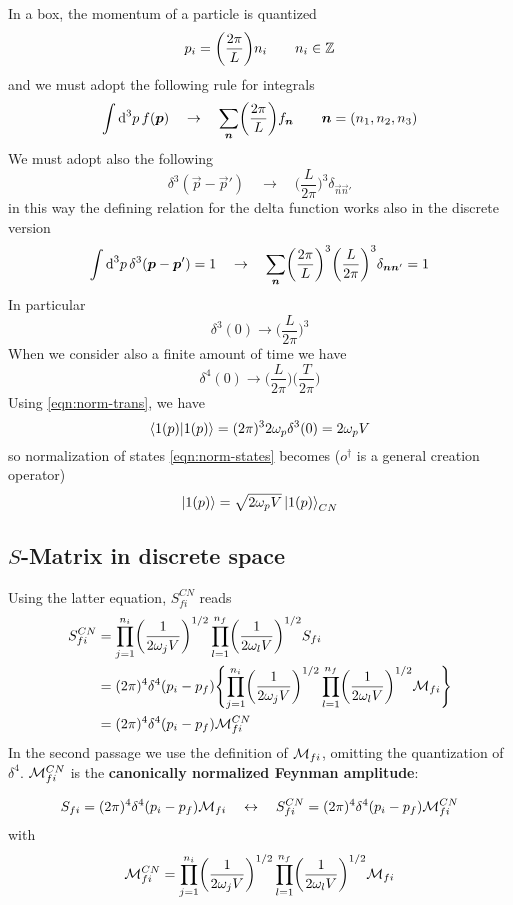 \documentclass[TheoreticalPhy_ModB.tex]{subfiles}
\begin{document}
In a box, the momentum of a particle is quantized
\[
p_i = \biggl( \frac{2 \pi}{L} \biggr) n_i \qquad n_i \in \mathbb{Z}
\]
and we must adopt the following rule for integrals
\[
\int \textup{d}^3 p \, f(\boldsymbol{p}) \quad \to \quad \sum_{\boldsymbol{n}} \biggr( \frac{2 \pi}{L} \biggl) f_{\boldsymbol{n}}
\qquad \boldsymbol{n} = (n_1, n_2, n_3)
\]
We must adopt also the following
\[
\delta^3 (\vec{p} - \vec{p}')
\quad \to \quad
\biggl( \frac{L}{2 \pi} \biggr)^3 \delta_{\vec{n}\vec{n}'}
\]
in this way the defining relation for the delta function works also in the discrete version
\[
\int \textup{d}^3p \, \delta^3 (\boldsymbol{p} - \boldsymbol{p}') = 1
\quad \to \quad
\sum_{\boldsymbol{n}} \biggl( \frac{2 \pi}{L} \biggr)^3 \biggl( \frac{L}{2 \pi} \biggr)^3 \delta_{\boldsymbol{n}\boldsymbol{n}'} = 1
\]
In particular
\[
\delta^3(0) \to \biggl( \frac{L}{2 \pi} \biggr)^3 
\]
When we consider also a finite amount of time we have
\[
\delta^4 (0) \to \biggl( \frac{L}{2 \pi} \biggr) \biggl( \frac{T}{2 \pi} \biggr)
\]
Using \eqref{eqn:norm-trans}, we have
\[
\braket{1(p)}{1(p)} = (2 \pi)^3 2 \omega_p \delta^3(0) = 2 \omega_p V 
\]
so normalization of states \eqref{eqn:norm-states} becomes ($o^\dagger$ is a general creation operator)
\[
\ket{1(p)} =  \sqrt{2 \omega_p V} \ket{1(p)}_{CN}
\]

\subsection{$S$-Matrix in discrete space}
Using the latter equation, $S_{fi}^{CN}$ reads
\[
\begin{split}
S_{fi}^{CN}	& = \prod_{j=1}^{n_i} \biggl( \frac{1}{2 \omega_j V} \biggr)^{1/2} \prod_{l=1}^{n_f} \biggl( \frac{1}{2\omega_l V} \biggr)^{1/2} S_{fi}\\
			& = (2 \pi)^4 \delta^4 (p_i - p_f)
				\Biggl\{ \prod_{j=1}^{n_i} \biggl( \frac{1}{2 \omega_j V} \biggr)^{1/2}
					    \prod_{l=1}^{n_f} \biggl( \frac{1}{2 \omega_l V} \biggr)^{1/2}
				\mathcal{M}_{fi} \Biggr\} \\
			& = (2 \pi)^4 \delta^4 (p_i - p_f) \mathcal{M}_{fi}^{CN}
\end{split}
\]
In the second passage we use the definition of $\mathcal{M}_{fi}$, omitting the quantization of $\delta^4$.
$\mathcal{M}_{fi}^{CN}$ is the \textbf{canonically normalized Feynman amplitude}:

\[S_{fi}=(2\pi)^4\delta^4(p_i-p_f)\mathcal M_{fi} \quad\leftrightarrow\quad S_{fi}^{CN} = (2 \pi)^4 \delta^4 (p_i - p_f) \mathcal{M}_{fi}^{CN}\]
with
\[\mathcal{M}_{fi}^{CN}=\prod_{j=1}^{n_i} \biggl( \frac{1}{2 \omega_j V} \biggr)^{1/2}
					    \prod_{l=1}^{n_f} \biggl( \frac{1}{2 \omega_l V} \biggr)^{1/2}
				\mathcal{M}_{fi}\]
\end{document}
